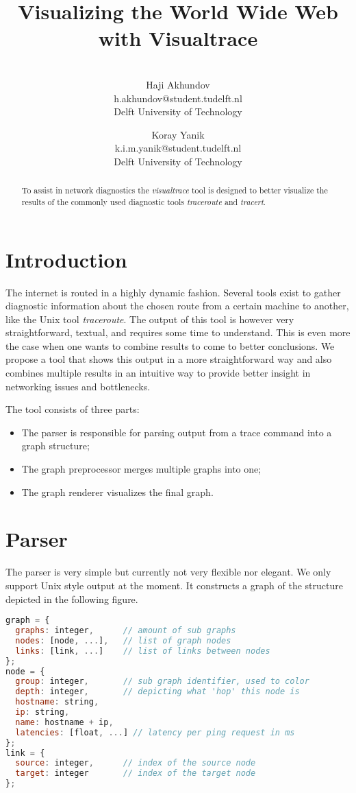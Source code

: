 \documentclass[a4paper,10pt]{article}
\title{Visualizing the World Wide Web with Visualtrace}
\author{\\Haji Akhundov\\h.akhundov@student.tudelft.nl\\ Delft University of Technology \and Koray Yanik\\k.i.m.yanik@student.tudelft.nl\\ Delft University of Technology}
\begin{document}
\maketitle

\begin{abstract}
To assist in network diagnostics the \emph{visualtrace} tool is designed to better visualize the results of the commonly used diagnostic tools \emph{traceroute} and \emph{tracert}.
\end{abstract}

\section{Introduction}
The internet is routed in a highly dynamic fashion. Several tools exist to gather diagnostic information about the chosen route from a certain machine to another, like the Unix tool \emph{traceroute}. The output of this tool is however very straightforward, textual, and requires some time to understand. This is even more the case when one wants to combine results to come to better conclusions. We propose a tool that shows this output in a more straightforward way and also combines multiple results in an intuitive way to provide better insight in networking issues and bottlenecks.

The tool consists of three parts:
\begin{itemize}
\item The parser is responsible for parsing output from a trace command into a graph structure;
\item The graph preprocessor merges multiple graphs into one;
\item The graph renderer visualizes the final graph.
\end{itemize}

\section{Parser}
The parser is very simple but currently not very flexible nor elegant. We only support Unix style output at the moment. It constructs a graph of the structure depicted in the following figure.

\begin{lstlisting}[language=JavaScript]
graph = {
  graphs: integer,      // amount of sub graphs
  nodes: [node, ...],   // list of graph nodes
  links: [link, ...]    // list of links between nodes
};
node = {
  group: integer,       // sub graph identifier, used to color
  depth: integer,       // depicting what 'hop' this node is
  hostname: string,
  ip: string,
  name: hostname + ip,
  latencies: [float, ...] // latency per ping request in ms
};
link = {
  source: integer,      // index of the source node
  target: integer       // index of the target node
};
\end{lstlisting}
\end{document}
